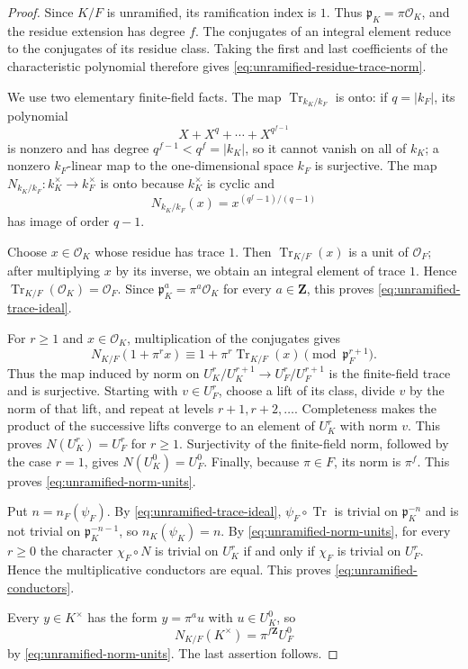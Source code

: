 \documentclass[11pt]{amsart}
\theoremstyle{definition}
\theoremstyle{remark}
\newcommand{\cO}{\mathcal O}
\newcommand{\p}{\mathfrak p}
\newcommand{\Tr}{\operatorname{Tr}}
\begin{document}
\begin{proof}
Since $K/F$ is unramified, its ramification index is $1$.  Thus
$\p_K=\pi\cO_K$, and the residue extension has degree $f$.
The conjugates of an integral element reduce to the conjugates of its
residue class.  Taking the first and last coefficients of the
characteristic polynomial therefore gives
\eqref{eq:unramified-residue-trace-norm}.

We use two elementary finite-field facts.  The map
$\Tr_{k_K/k_F}$ is onto: if $q=|k_F|$, its polynomial
\[
 X+X^q+\cdots+X^{q^{f-1}}
\]
is nonzero and has degree $q^{f-1}<q^f=|k_K|$, so it cannot vanish on
all of $k_K$; a nonzero $k_F$-linear map to the one-dimensional space
$k_F$ is surjective.  The map $N_{k_K/k_F}:k_K^\times\to k_F^\times$
is onto because $k_K^\times$ is cyclic and
\[
 N_{k_K/k_F}(x)=x^{(q^f-1)/(q-1)}
\]
has image of order $q-1$.

Choose $x\in\cO_K$ whose residue has trace $1$.  Then
$\Tr_{K/F}(x)$ is a unit of $\cO_F$; after multiplying $x$ by its
inverse, we obtain an integral element of trace $1$.  Hence
$\Tr_{K/F}(\cO_K)=\cO_F$.  Since
$\p_K^a=\pi^a\cO_K$ for every $a\in\mathbf Z$, this proves
\eqref{eq:unramified-trace-ideal}.

For $r\geq1$ and $x\in\cO_K$, multiplication of the conjugates gives
\begin{equation}\label{eq:unramified-graded-norm}
 N_{K/F}(1+\pi^r x)
 \equiv 1+\pi^r\Tr_{K/F}(x)\pmod{\p_F^{r+1}}.
\end{equation}
Thus the map induced by norm on
$U_K^r/U_K^{r+1}\to U_F^r/U_F^{r+1}$ is the finite-field trace and is
surjective.  Starting with $v\in U_F^r$, choose a lift of its class,
divide $v$ by the norm of that lift, and repeat at levels
$r+1,r+2,\ldots$.  Completeness makes the product of the successive
lifts converge to an element of $U_K^r$ with norm $v$.  This proves
$N(U_K^r)=U_F^r$ for $r\geq1$.  Surjectivity of the finite-field norm,
followed by the case $r=1$, gives $N(U_K^0)=U_F^0$.  Finally, because
$\pi\in F$, its norm is $\pi^f$.  This proves
\eqref{eq:unramified-norm-units}.

Put $n=n_F(\psi_F)$.  By \eqref{eq:unramified-trace-ideal},
$\psi_F\circ\Tr$ is trivial on $\p_K^{-n}$ and is not trivial on
$\p_K^{-n-1}$, so $n_K(\psi_K)=n$.  By
\eqref{eq:unramified-norm-units}, for every $r\geq0$ the character
$\chi_F\circ N$ is trivial on $U_K^r$ if and only if $\chi_F$ is
trivial on $U_F^r$.  Hence the multiplicative conductors are equal.
This proves \eqref{eq:unramified-conductors}.

Every $y\in K^\times$ has the form $y=\pi^a u$ with
$u\in U_K^0$, so
\[
 N_{K/F}(K^\times)=\pi^{f\mathbf Z}U_F^0
\]
by \eqref{eq:unramified-norm-units}.  The last assertion follows.
\end{proof}
\end{document}
